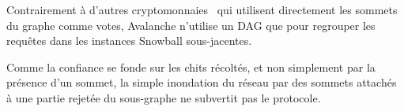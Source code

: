\documentclass[a4,twocolumn,10pt]{article}
\theoremstyle{definition}
\begin{document}
Contrairement à d'autres cryptomonnaies~\cite{IOTA} qui utilisent directement les sommets du graphe comme votes, Avalanche n'utilise un DAG que pour regrouper les requêtes dans les instances Snowball sous-jacentes.

Comme la confiance se fonde sur les chits récoltés, et non simplement par la présence d'un sommet, la simple inondation du réseau par des sommets attachés à une partie rejetée du sous-graphe ne subvertit pas le protocole.

\end{document}
